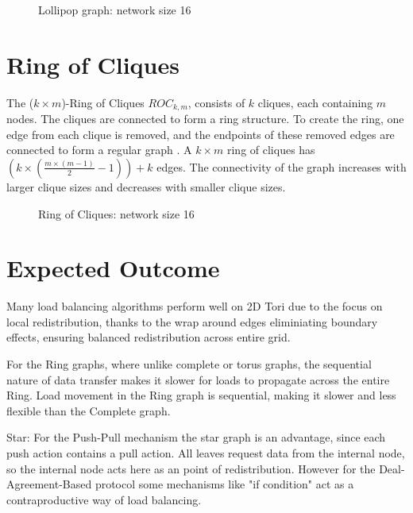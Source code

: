 \begin{figure}[H]
    \centering
    \scalebox{1}{}
    \caption{Lollipop graph: network size 16}
    \label{fig:lollipopgraphDemo}
\end{figure}

\section{Ring of Cliques}\label{sec:2ringofcliquegraph}
The ($k \times m$)-Ring of Cliques $ROC_{k,m}$, consists of $k$ cliques, each containing $m$ nodes. The cliques are connected to form a ring structure. To create the ring, one edge from each clique is removed, and the endpoints of these removed edges are connected to form a regular graph \cite{Mahlmann2010}. A $k \times m$ ring of cliques has $\left( k\times \left(\frac{m\times (m - 1)}{2}-1 \right) \right)+k$ edges. The connectivity of the graph increases with larger clique sizes and decreases with smaller clique sizes.

\begin{figure}[H]
    \centering
    \scalebox{1}{}
    \caption{Ring of Cliques: network size 16}
    \label{fig:ringofcliquesDemo}
\end{figure}

\section{Expected Outcome}\label{sec:expectedoutcome}
Many load balancing algorithms perform well on 2D Tori due to the focus on local redistribution, thanks to the wrap around edges eliminiating boundary effects, ensuring balanced redistribution across entire grid.

For the Ring graphs, where unlike complete or torus graphs, the sequential nature of data transfer makes it slower for loads to propagate across the entire Ring. Load movement in the Ring graph is sequential, making it slower and less flexible than the Complete graph.

Star: For the Push-Pull mechanism the star graph is an advantage, since each push action contains a pull action. All leaves request data from the internal node, so the internal node acts here as an point of redistribution. However for the Deal-Agreement-Based protocol some mechanisms like "if condition" act as a contraproductive way of load balancing.

